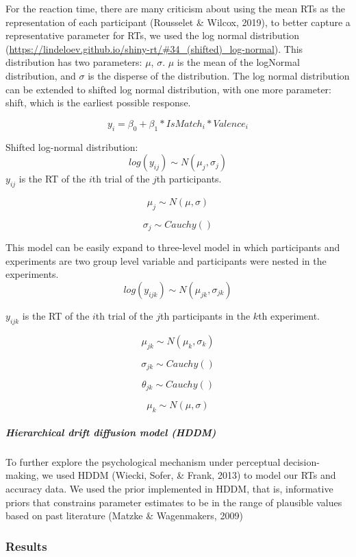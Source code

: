 \documentclass[
  english,
  man]{apa6}
\let\oldsubparagraph\subparagraph
\renewcommand{\subparagraph}[1]{\oldsubparagraph{#1}\mbox{}}
\begin{document}
For the reaction time, there are many criticism about using the mean RTs as the representation of each participant (Rousselet \& Wilcox, 2019), to better capture a representative parameter for RTs, we used the log normal distribution (\url{https://lindeloev.github.io/shiny-rt/\#34_(shifted)_log-normal}). This distribution has two parameters: \(\mu\), \(\sigma\). \(\mu\) is the mean of the logNormal distribution, and \(\sigma\) is the disperse of the distribution. The log normal distribution can be extended to shifted log normal distribution, with one more parameter: shift, which is the earliest possible response.

\[y_{i} = \beta_{0} + \beta_{1}*IsMatch_{i} * Valence_{i}\]

Shifted log-normal distribution:
\[ log(y_{ij}) \sim N(\mu_{j}, \sigma_{j})\]
\(y_{ij}\) is the RT of the \(i\)th trial of the \(j\)th participants.

\[\mu_{j} \sim N(\mu, \sigma)\]

\[\sigma_{j} \sim Cauchy()\]

This model can be easily expand to three-level model in which participants and experiments are two group level variable and participants were nested in the experiments.
\[ log(y_{ijk}) \sim N(\mu_{jk}, \sigma_{jk})\]

\(y_{ijk}\) is the RT of the \(i\)th trial of the \(j\)th participants in the \(k\)th experiment.

\[\mu_{jk} \sim N(\mu_{k}, \sigma_{k})\]

\[\sigma_{jk} \sim Cauchy()\]

\[\theta_{jk} \sim Cauchy()\]

\[\mu_{k} \sim N(\mu, \sigma)\]

\hypertarget{hierarchical-drift-diffusion-model-hddm}{%
\subparagraph{Hierarchical drift diffusion model (HDDM)}\label{hierarchical-drift-diffusion-model-hddm}}

To further explore the psychological mechanism under perceptual decision-making, we used HDDM (Wiecki, Sofer, \& Frank, 2013) to model our RTs and accuracy data. We used the prior implemented in HDDM, that is, informative priors that constrains parameter estimates to be in the range of plausible values based on past literature (Matzke \& Wagenmakers, 2009)

\hypertarget{results}{%
\subsubsection{Results}\label{results}}
\end{document}
